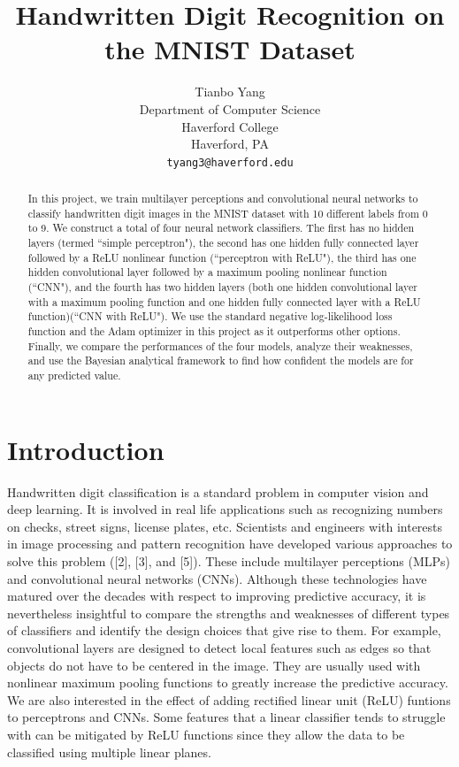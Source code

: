 \documentclass{article}
\title{Handwritten Digit Recognition on the MNIST Dataset}
\author{%
  Tianbo Yang  \\
  Department of Computer Science\\
  Haverford College\\
  Haverford, PA  \\
  \texttt{tyang3@haverford.edu} \\
}
\begin{document}
\maketitle


\begin{abstract}
  In this project, we train multilayer perceptions and convolutional neural networks to classify handwritten digit images in the MNIST dataset with 10 different labels from 0 to 9. We construct a total of four neural network classifiers. The first has no hidden layers (termed ``simple perceptron"), the second has one hidden fully connected layer followed by a ReLU nonlinear function (``perceptron with ReLU"), the third has one hidden convolutional layer followed by a maximum pooling nonlinear function (``CNN"), and the fourth has two hidden layers (both one hidden convolutional layer with a maximum pooling function and one hidden fully connected layer with a ReLU function)(``CNN with ReLU"). We use the standard negative log-likelihood loss function and the Adam optimizer in this project as it outperforms other options. Finally, we compare the performances of the four models, analyze their weaknesses, and use the Bayesian analytical framework to find how confident the models are for any predicted value.
\end{abstract}

\section{Introduction}


Handwritten digit classification is a standard problem in computer vision and deep learning. It is involved in real life applications such as recognizing numbers on checks, street signs, license plates, etc. Scientists and engineers with interests in image processing and pattern recognition have developed various approaches to solve this problem ([2], [3], and [5]). These include multilayer perceptions (MLPs) and convolutional neural networks (CNNs). Although these technologies have matured over the decades with respect to improving predictive accuracy, it is nevertheless insightful to compare the strengths and weaknesses of different types of classifiers and identify the design choices that give rise to them. For example, convolutional layers are designed to detect local features such as edges so that objects do not have to be centered in the image. They are usually used with nonlinear maximum pooling functions to greatly increase the predictive accuracy. We are also interested in the effect of adding rectified linear unit (ReLU) funtions to perceptrons and CNNs. Some features that a linear classifier tends to struggle with can be mitigated by ReLU functions since they allow the data to be classified using multiple linear planes.
\end{document}
